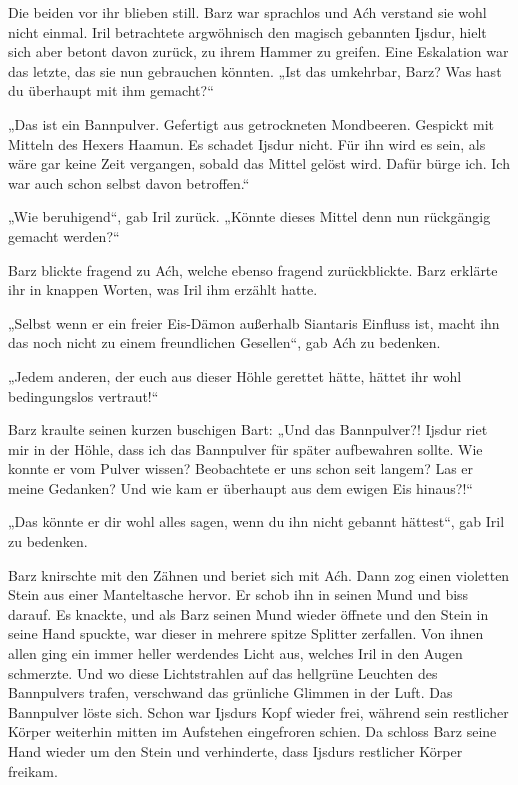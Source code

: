 Die beiden vor ihr blieben still. Barz war sprachlos und Aćh verstand sie wohl nicht einmal. Iril betrachtete argwöhnisch den magisch gebannten Ijsdur, hielt sich aber betont davon zurück, zu ihrem Hammer zu greifen. Eine Eskalation war das letzte, das sie nun gebrauchen könnten. „Ist das umkehrbar, Barz? Was hast du überhaupt mit ihm gemacht?“

„Das ist ein Bannpulver. Gefertigt aus getrockneten Mondbeeren. Gespickt mit Mitteln des Hexers Haamun. Es schadet Ijsdur nicht. Für ihn wird es sein, als wäre gar keine Zeit vergangen, sobald das Mittel gelöst wird. Dafür bürge ich. Ich war auch schon selbst davon betroffen.“

„Wie beruhigend“, gab Iril zurück. „Könnte dieses Mittel denn nun rückgängig gemacht werden?“

Barz blickte fragend zu Aćh, welche ebenso fragend zurückblickte. Barz erklärte ihr in knappen Worten, was Iril ihm erzählt hatte.

„Selbst wenn er ein freier Eis-Dämon außerhalb Siantaris Einfluss ist, macht ihn das noch nicht zu einem freundlichen Gesellen“, gab Aćh zu bedenken.

„Jedem anderen, der euch aus dieser Höhle gerettet hätte, hättet ihr wohl bedingungslos vertraut!“

Barz kraulte seinen kurzen buschigen Bart: „Und das Bannpulver?! Ijsdur riet mir in der Höhle, dass ich das Bannpulver für später aufbewahren sollte. Wie konnte er vom Pulver wissen? Beobachtete er uns schon seit langem? Las er meine Gedanken? Und wie kam er überhaupt aus dem ewigen Eis hinaus?!“

„Das könnte er dir wohl alles sagen, wenn du ihn nicht gebannt hättest“, gab Iril zu bedenken.

Barz knirschte mit den Zähnen und beriet sich mit Aćh. Dann zog einen violetten Stein aus einer Manteltasche hervor. Er schob ihn in seinen Mund und biss darauf. Es knackte, und als Barz seinen Mund wieder öffnete und den Stein in seine Hand spuckte, war dieser in mehrere spitze Splitter zerfallen. Von ihnen allen ging ein immer heller werdendes Licht aus, welches Iril in den Augen schmerzte. Und wo diese Lichtstrahlen auf das hellgrüne Leuchten des Bannpulvers trafen, verschwand das grünliche Glimmen in der Luft. Das Bannpulver löste sich. Schon war Ijsdurs Kopf wieder frei, während sein restlicher Körper weiterhin mitten im Aufstehen eingefroren schien. Da schloss Barz seine Hand wieder um den Stein und verhinderte, dass Ijsdurs restlicher Körper freikam.

